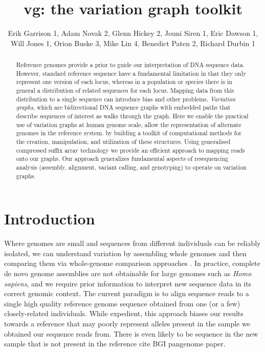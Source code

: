 \documentclass[12pt]{article}
\begin{document}
\title{vg: the variation graph toolkit}

\author{Erik Garrison 1, Adam Novak 2, Glenn Hickey 2, Jouni Siren 1, Eric
  Dawson 1, Will Jones 1, Orion Buske 3, Mike Lin 4, Benedict Paten 2,
  Richard Durbin 1}

\maketitle

\begin{abstract}
Reference genomes provide a prior to guide our interpretation of DNA sequence data.
However, standard reference sequence have a fundamental limitation in that they only represent one version of each locus, whereas
in a population or species there is in general a distribution of related sequences for each locus.
Mapping data from this distribution to a single sequence can introduce bias and other problems.
\emph{Variation graphs}, which are bidirectional DNA sequence graphs with embedded paths that describe sequences of interest as walks through the graph.
Here we enable the practical use of variation graphs at human genome scale, allow the representation of alternate genomes in the reference system.
by building a toolkit of computational methods for the creation, manipulation, and utilization of these structures.
Using generalised compressed suffix array technology we provide an efficient approach to mapping reads onto our graphs.
Our approach generalizes fundamental aspects of resequencing analysis (assembly, alignment, variant calling, and genotyping) to operate on variation graphs.
\end{abstract}

\section{Introduction}

Where genomes are small and sequences from different individuals can be reliably isolated, we can understand variation by assembling whole genomes and then comparing them via whole-genome comparison approaches \cite{mummer}.
In practice, complete de novo genome assemblies are not obtainable for large genomes such as \emph{Homo sapiens}, and we require prior information to interpret new sequence data in its correct genomic context.  
The current paradigm is to align sequence reads to a single high quality reference genome sequence obtained from one (or a few)  closely-related individuals.  
While expedient, this approach biases our results towards a reference that may poorly represent alleles present in the sample we obtained our sequence reads from.  
There is even likely to be sequence in the new sample that is not present in the reference {cite BGI pangenome paper}.  
\end{document}
